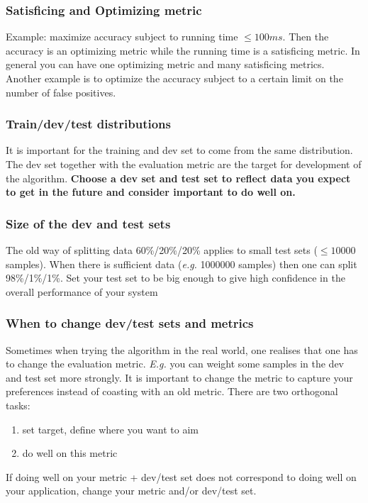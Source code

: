 \documentclass{article}
\begin{document}
\subsubsection{Satisficing and Optimizing metric}
Example: maximize accuracy subject to running time $\le 100ms$.
Then the accuracy is an optimizing metric while the running time is a satisficing metric.
In general you can have one optimizing metric and many satisficing metrics.
Another example is to optimize the accuracy subject to a certain limit on the number of false positives.

\subsubsection{Train/dev/test distributions}
It is important for the training and dev set to come from the same distribution.
The dev set together with the evaluation metric are the target for development of the algorithm.
\textbf{Choose a dev set and test set to reflect data you expect to get in the future and consider important to do well on.}

\subsubsection{Size of the dev and test sets}
The old way of splitting data 60\%/20\%/20\% applies to small test sets ($\le 10000$ samples).
When there is sufficient data (\emph{e.g.} 1000000 samples) then one can split 98\%/1\%/1\%.
Set your test set to be big enough to give high confidence in the overall performance of your system

\subsubsection{When to change dev/test sets and metrics}
Sometimes when trying the algorithm in the real world, one realises that one has to change the evaluation metric.
\emph{E.g.} you can weight some samples in the dev and test set more strongly.
It is important to change the metric to capture your preferences instead of coasting with an old metric.
There are two orthogonal tasks:
\begin{enumerate}
  \item set target, define where you want to aim
  \item do well on this metric
\end{enumerate}
If doing well on your metric + dev/test set does not correspond to doing well on your application, change your metric and/or dev/test set.
\end{document}
